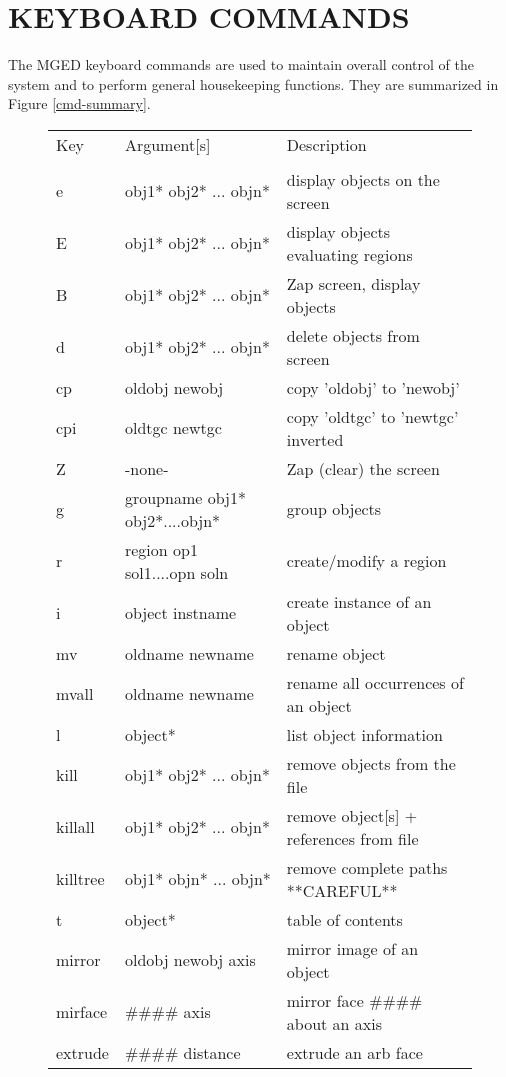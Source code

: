 \chapter{KEYBOARD COMMANDS}

The MGED keyboard commands are used to maintain overall control of the
system and to perform general housekeeping functions.
They are summarized in Figure \ref{cmd-summary}.

\begin{figure}[tb]
\begin{tabular}{l l l}
Key	& Argument[s]	& Description \\
\\
  e	& obj1* obj2* ... objn*	& display objects on the screen \\
  E	& obj1* obj2* ... objn*	& display objects evaluating regions \\
  B	& obj1* obj2* ... objn*	& Zap screen, display objects \\
  d	& obj1* obj2* ... objn*	& delete objects from screen \\
  cp	& oldobj newobj	& copy 'oldobj' to 'newobj' \\
  cpi	& oldtgc newtgc	& copy 'oldtgc' to 'newtgc' inverted \\
  Z	& -none-	& Zap (clear) the screen \\
  g	& groupname obj1* obj2*....objn*	& group objects \\
  r	& region op1 sol1....opn soln	& create/modify a region \\
  i	& object instname	& create instance of an object \\
  mv	& oldname newname	& rename object \\
  mvall	& oldname newname	& rename all occurrences of an object \\
  l	& object*	& list object information \\
  kill	& obj1* obj2* ... objn*	& remove objects from the file \\
  killall	& obj1* obj2* ... objn*	& remove object[s] + references from file \\
  killtree	& obj1* objn* ... objn*	& remove complete paths  **CAREFUL** \\
  t	& object*	& table of contents \\
  mirror	& oldobj newobj axis	& mirror image of an object \\
  mirface	& \#\#\#\# axis	& mirror face \#\#\#\# about an axis \\
  extrude	& \#\#\#\# distance	& extrude an arb face \\

\end{tabular}
\end{figure}
